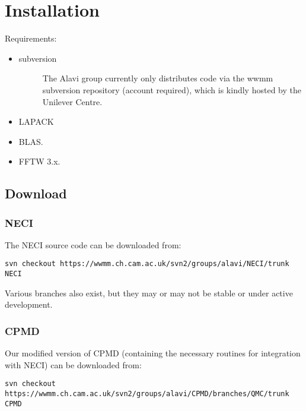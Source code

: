 \documentclass[openany,a4paper,10pt]{manual}
\begin{document}
\hypertarget{installation}{}\chapter{Installation}

Requirements:
\begin{itemize}
\item {} \begin{description}
\item[subversion]
The Alavi group currently only distributes code via the wwmm
subversion repository (account required), which is kindly hosted
by the Unilever Centre.

\end{description}

\item {} 
LAPACK

\item {} 
BLAS.

\item {} 
FFTW 3.x.

\end{itemize}


\section{Download}


\subsection{NECI}

The NECI source code can be downloaded from:

\begin{Verbatim}[commandchars=@\[\]]
svn checkout https://wwmm.ch.cam.ac.uk/svn2/groups/alavi/NECI/trunk NECI
\end{Verbatim}

Various branches also exist, but they may or may not be stable or under
active development.


\subsection{CPMD}

Our modified version of CPMD (containing the necessary routines for
integration with NECI) can be downloaded from:

\begin{Verbatim}[commandchars=@\[\]]
svn checkout https://wwmm.ch.cam.ac.uk/svn2/groups/alavi/CPMD/branches/QMC/trunk CPMD
\end{Verbatim}
\end{document}
